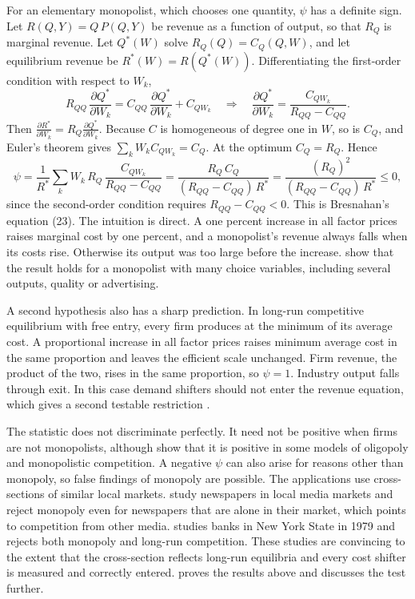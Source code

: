 For an elementary monopolist, which chooses one quantity, $\psi$ has a definite sign. Let $R(Q, Y) = Q\,P(Q, Y)$ be
revenue as a function of output, so that $R_Q$ is marginal revenue. Let $Q^*(W)$ solve $R_Q(Q) = C_Q(Q, W)$, and let
equilibrium revenue be $R^*(W) = R(Q^*(W))$. Differentiating the first-order condition with respect to $W_k$,
\begin{equation*}
R_{QQ}\,\frac{\partial Q^*}{\partial W_k} = C_{QQ}\,\frac{\partial Q^*}{\partial W_k} + C_{QW_k}
\quad\Longrightarrow\quad
\frac{\partial Q^*}{\partial W_k} = \frac{C_{QW_k}}{R_{QQ} - C_{QQ}} .
\end{equation*}
Then $\frac{\partial R^*}{\partial W_k} = R_Q \frac{\partial Q^*}{\partial W_k}$. Because $C$ is homogeneous of degree
one in $W$, so is $C_Q$, and Euler's theorem gives $\sum_k W_k C_{QW_k} = C_Q$. At the optimum $C_Q = R_Q$. Hence
\begin{equation}\label{eq:01-pr-monopoly}
\psi = \frac{1}{R^*}\sum_k W_k\,R_Q\,\frac{C_{QW_k}}{R_{QQ} - C_{QQ}}
     = \frac{R_Q\,C_Q}{(R_{QQ} - C_{QQ})\,R^*}
     = \frac{(R_Q)^2}{(R_{QQ} - C_{QQ})\,R^*} \le 0 ,
\end{equation}
since the second-order condition requires $R_{QQ} - C_{QQ} < 0$. This is Bresnahan's equation (23). The intuition is
direct. A one percent increase in all factor prices raises marginal cost by one percent, and a monopolist's revenue
always falls when its costs rise. Otherwise its output was too large before the increase. \citet{PanzarRosse1987} show
that the result holds for a monopolist with many choice variables, including several outputs, quality or advertising.

A second hypothesis also has a sharp prediction. In long-run competitive equilibrium with free entry, every firm
produces at the minimum of its average cost. A proportional increase in all factor prices raises minimum average cost in
the same proportion and leaves the efficient scale unchanged. Firm revenue, the product of the two, rises in the same
proportion, so $\psi = 1$. Industry output falls through exit. In this case demand shifters should not enter the
revenue equation, which gives a second testable restriction \citep[p.~1037 and fn.~30]{Bresnahan1989}.

The statistic does not discriminate perfectly. It need not be positive when firms are not monopolists, although
\citet{PanzarRosse1987} show that it is positive in some models of oligopoly and monopolistic competition. A negative
$\psi$ can also arise for reasons other than monopoly, so false findings of monopoly are possible. The applications
use cross-sections of similar local markets. \citet{PanzarRosse1977} study newspapers in local media markets and reject
monopoly even for newspapers that are alone in their market, which points to competition from other media.
\citet{Shaffer1982} studies banks in New York State in 1979 and rejects both monopoly and long-run competition. These
studies are convincing to the extent that the cross-section reflects long-run equilibria and every cost shifter is
measured and correctly entered.  proves the results above and discusses the test further.

